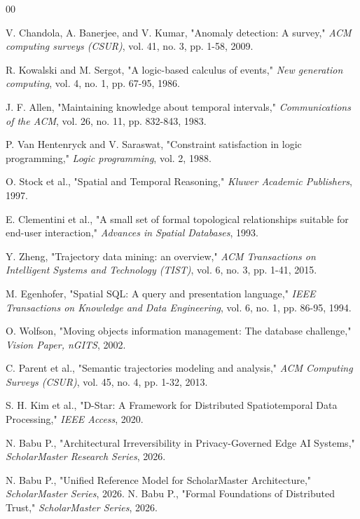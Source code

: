 \documentclass[conference]{IEEEtran}
\begin{document}
\begin{thebibliography}{00}

 V. Chandola, A. Banerjee, and V. Kumar, "Anomaly detection: A survey," \textit{ACM computing surveys (CSUR)}, vol. 41, no. 3, pp. 1-58, 2009.

 R. Kowalski and M. Sergot, "A logic-based calculus of events," \textit{New generation computing}, vol. 4, no. 1, pp. 67-95, 1986.

 J. F. Allen, "Maintaining knowledge about temporal intervals," \textit{Communications of the ACM}, vol. 26, no. 11, pp. 832-843, 1983.

 P. Van Hentenryck and V. Saraswat, "Constraint satisfaction in logic programming," \textit{Logic programming}, vol. 2, 1988.

 O. Stock et al., "Spatial and Temporal Reasoning," \textit{Kluwer Academic Publishers}, 1997.

 E. Clementini et al., "A small set of formal topological relationships suitable for end-user interaction," \textit{Advances in Spatial Databases}, 1993.

 Y. Zheng, "Trajectory data mining: an overview," \textit{ACM Transactions on Intelligent Systems and Technology (TIST)}, vol. 6, no. 3, pp. 1-41, 2015.

 M. Egenhofer, "Spatial SQL: A query and presentation language," \textit{IEEE Transactions on Knowledge and Data Engineering}, vol. 6, no. 1, pp. 86-95, 1994.

 O. Wolfson, "Moving objects information management: The database challenge," \textit{Vision Paper, nGITS}, 2002.

 C. Parent et al., "Semantic trajectories modeling and analysis," \textit{ACM Computing Surveys (CSUR)}, vol. 45, no. 4, pp. 1-32, 2013.

 S. H. Kim et al., "D-Star: A Framework for Distributed Spatiotemporal Data Processing," \textit{IEEE Access}, 2020.

 N. Babu P., "Architectural Irreversibility in Privacy-Governed Edge AI Systems," \textit{ScholarMaster Research Series}, 2026.


 N. Babu P., "Unified Reference Model for ScholarMaster Architecture," \textit{ScholarMaster Series}, 2026.
 N. Babu P., "Formal Foundations of Distributed Trust," \textit{ScholarMaster Series}, 2026.
\end{thebibliography}
\end{document}
